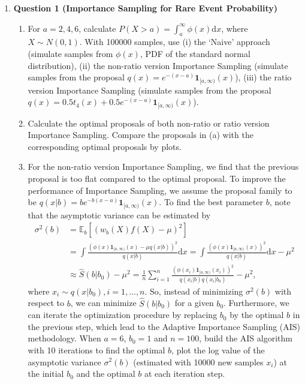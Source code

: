\documentclass[notitlepage,a4paper,12pt]{article}%
\begin{document}
\begin{enumerate}

\item 
{\bf Question 1 (Importance Sampling for Rare Event Probability)}

\begin{enumerate} 
\item For $a=2, 4, 6$, calculate $P(X>a)=\int_a^\infty\phi(x)\mathrm{d} x$, where $X\sim N(0, 1)$. 
With 100000 samples, use (i) the `Naive' approach (simulate samples from $\phi(x)$, PDF of the standard normal distribution),
   (ii) the non-ratio version Importance Sampling (simulate samples from the proposal $q(x)=e^{-(x-a)}\mathbf{1}_{[a,\infty)}(x)$),
    (iii) the ratio version Importance Sampling
    (simulate samples from the proposal $q(x)=0.5t_4(x)+0.5e^{-(x-a)}\mathbf{1}_{[a,\infty)}(x)$). 

\item Calculate the optimal proposals of both non-ratio or ratio version Importance Sampling. Compare the proposals in (a) with the corresponding optimal proposals by plots.

\item For the non-ratio version Importance Sampling, we find that the previous proposal 
is too flat compared to the optimal proposal. To improve the performance of Importance Sampling, we assume the proposal family to be $q(x|b)=be^{-b(x-a)}\mathbf{1}_{[a,\infty)}(x)$. To find the best parameter $b$, note that the asymptotic variance can be estimated by
\begin{align*}
\sigma^2(b)&=\mathbb{E}_b[(w_b(X)f(X)-\mu)^2]\\
&=\int\frac{(\phi(x)\mathbf{1}_{[a,\infty)}(x)-\mu q(x|b))^2}{q(x|b)}\mathrm{d}x=\int\frac{(\phi(x)\mathbf{1}_{[a,\infty)}(x))^2}{q(x|b)}\mathrm{d}x-\mu^2\\
&\approx\hat{S}(b|b_0)-\mu^2=\frac{1}{n}\sum_{i=1}^n\frac{(\phi(x_i)\mathbf{1}_{[a,\infty)}(x_i))^2}{q(x_i|b)q(x_i|b_0)}-\mu^2, 
\end{align*}
where $x_i\sim q(x|b_0), i=1,\dots,n.$
So, instead of minimizing $\sigma^2(b)$ with respect to $b$, we can minimize $\hat{S}(b|b_0)$ for a given $b_0$. Furthermore, we can 
iterate the optimization procedure by replacing $b_0$ by the optimal $b$
in the previous step, which lead to the Adaptive Importance Sampling (AIS) methodology. 
When $a=6$, $b_0=1$ and $n=100$, build the AIS algorithm with 10 iterations to find the optimal $b$,
 plot the log value of the  asymptotic variance $\sigma^2(b)$ (estimated with 10000 new samples $x_i$) 
at the initial $b_0$ and the optimal $b$ at each iteration step.


\end{enumerate}
\end{enumerate}
\end{document}
